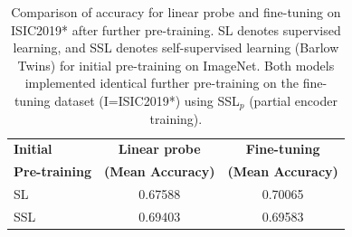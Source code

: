 \documentclass[a4paper,fleqn]{cas-dc}
\begin{document}

\begin{table}[htbp!]
\centering
\begin{tabular}{lcc}
\toprule
\textbf{Initial} & \textbf{Linear probe} & \textbf{Fine-tuning} \\
\textbf{Pre-training} & \textbf{(Mean Accuracy)} & \textbf{(Mean Accuracy)} \\ 
\midrule
SL & 0.67588 & 0.70065 \\
SSL & 0.69403 & 0.69583 \\
\bottomrule
\end{tabular}
\caption{Comparison of accuracy for linear probe and fine-tuning on ISIC2019* after further pre-training. SL denotes supervised learning, and SSL denotes self-supervised learning (Barlow Twins) for initial pre-training on ImageNet. Both models implemented identical further pre-training on the fine-tuning dataset (I=ISIC2019*) using SSL$_p$ (partial encoder training).
}
\label{tab:comparison_table_after_pretraining}
\end{table}
\end{document}
